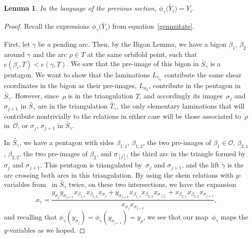 \documentclass[pdftex]{sigma}%
\numberwithin{equation}{section}
\newtheorem{Lemma}[Theorem]{Lemma}
\begin{document}
\begin{Lemma}\label{phimapsys}
In the language of the previous section, $\phi_\gamma\big(\widetilde{Y_i}\big) = Y_i$.
\end{Lemma}

\begin{proof}Recall the expressions $\phi_\gamma\big(\widetilde{Y_i}\big)$ from equation~\eqref{genmutate}.

First, let $\gamma$ be a pending arc. Then, by the Bigon Lemma, we have a bigon $\beta_1$, $\beta_2$ around $\gamma$ and the arc $\rho \in T$ at the same orbifold point, such that $e(\beta_i, T) < e(\gamma,T)$. We saw that the pre-image of this bigon in $\widetilde{S_\gamma}$ is a pentagon. We want to show that the laminations $L_{\tau_{i_k}}$ contribute the same shear coordinates in the bigon as their pre-images, $L_{\sigma_k}$, contribute in the pentagon in~$\widetilde{S_\gamma}$. However, since~$\rho$ is in the triangulation $T$, and accordingly its images~$\sigma_j$ and~$ \sigma_{j+1}$ in $\widetilde{S_\gamma}$ are in the triangulation $\widetilde{T_\gamma}$, the only elementary laminations that will contribute nontrivially to the relations in either case will be those associated to~$\rho$ in~$\mathcal{O}$, or $\sigma_j$, $\sigma_{j+1}$ in $\widetilde{S_\gamma}$.

In $\widetilde{S_\gamma}$, we have a pentagon with sides $\beta_{1,1}$, $\beta_{1,2}$, the two pre-images of $\beta_1 \in \mathcal{O}$, $\beta_{2,1}$, $\beta_{2,2}$, the two pre-images of $\beta_2$, and $\sigma_{[j]}$, the third arc in the triangle formed by~$\sigma_j$ and $\sigma_{j+1}$. This pentagon is triangulated by~$\sigma_j$ and $\sigma_{j+1}$, and the lift $\widetilde{\gamma}$ is the arc crossing both arcs in this triangulation. By using the skein relations with $y$-variables from~\cite{MW} in $\widetilde{S_\gamma}$ twice, on these two intersections, we have the expansion
\[ x_{\widetilde{\gamma}} = \frac{ y_{\sigma_j} y_{\sigma_{j+1}} x_{\beta_{1,1}}x_{\beta_{1,2}}x_{\sigma_j} + y_{\sigma_{j+1}} x_{\beta_{1,1}}x_{\beta_{2,2}}x_{\sigma_{[j]}} + x_{\beta_{2,1}}x_{\beta_{2,2}}x_{\sigma_{j+1}}}{x_{\sigma_j}x_{\sigma_{j+1}}},
\] and recalling that $\phi_\gamma(y_{\sigma_j}) = \phi_\gamma(y_{\sigma_{j+1}}) = y_\rho$, we see that our map~$\phi_\gamma$ maps the $y$-variables as we hoped.


\end{proof}
\end{document}
